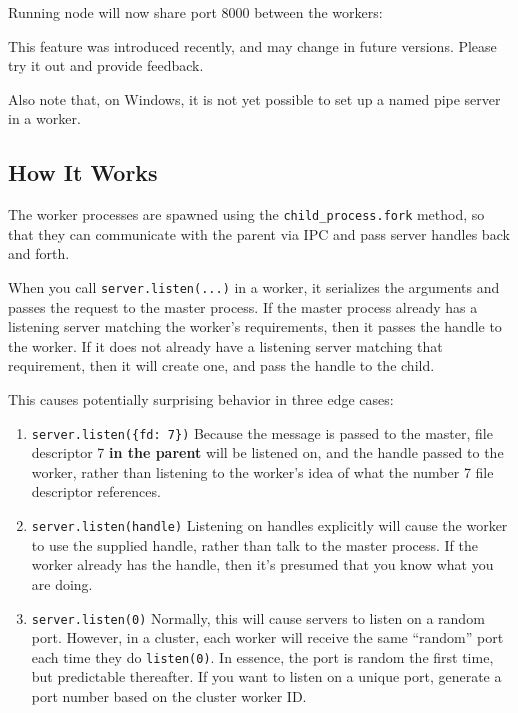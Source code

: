 Running node will now share port 8000 between the workers:

\begin{Shaded}
\end{Shaded}

This feature was introduced recently, and may change in future versions.
Please try it out and provide feedback.

Also note that, on Windows, it is not yet possible to set up a named
pipe server in a worker.

\subsection{How It Works}

The worker processes are spawned using the \texttt{child\_process.fork}
method, so that they can communicate with the parent via IPC and pass
server handles back and forth.

When you call \texttt{server.listen(...)} in a worker, it serializes the
arguments and passes the request to the master process. If the master
process already has a listening server matching the worker's
requirements, then it passes the handle to the worker. If it does not
already have a listening server matching that requirement, then it will
create one, and pass the handle to the child.

This causes potentially surprising behavior in three edge cases:

\begin{enumerate}[1.]
\item
  \texttt{server.listen(\{fd: 7\})} Because the message is passed to the
  master, file descriptor 7 \textbf{in the parent} will be listened on,
  and the handle passed to the worker, rather than listening to the
  worker's idea of what the number 7 file descriptor references.
\item
  \texttt{server.listen(handle)} Listening on handles explicitly will
  cause the worker to use the supplied handle, rather than talk to the
  master process. If the worker already has the handle, then it's
  presumed that you know what you are doing.
\item
  \texttt{server.listen(0)} Normally, this will cause servers to listen
  on a random port. However, in a cluster, each worker will receive the
  same ``random'' port each time they do \texttt{listen(0)}. In essence,
  the port is random the first time, but predictable thereafter. If you
  want to listen on a unique port, generate a port number based on the
  cluster worker ID.
\end{enumerate}

